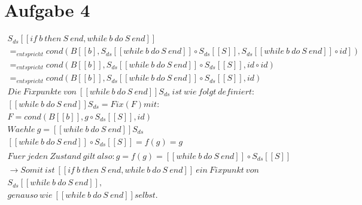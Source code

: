 \documentclass[]{article}
\begin{document}
\section{Aufgabe 4}
\begin{gather*}
S_{ds}  [[if \ b \ then \  S \  end, while \  b \  do \  S \  end ]] \\ 
=_{entspricht} cond(B [[b] , S_{ds} [[while \ b \  do \  S \ end]] \circ S_{ds}  [[S]], S_{ds} [[while \  b \  do \ S \  end ]] \circ id ])\\ 
=_{entspricht} cond(B [[b]], S_{ds} [[while \  b \  do \  S \ end]] \circ S_{ds}  [[S]],  id  \circ  id ) \\
=_{entspricht} cond(B [[b]], S_{ds} [[while \  b \  do \  S \ end]] \circ S_{ds}  [[S]],  id ) \\
Die \ Fixpunkte \ von \ [[while \ b \ do \ S \                                                                                                                                                                                                                                                                                                                                                       end ]] S_{ds} \ ist \ wie \ folgt \ definiert: \\ [[while \ b \ do \ S \ end]] S_{ds} = Fix(F) 
mit:\\  F = cond(B [[b]], g  \circ S_{ds}  [[S]],  id ) \\
Waehle \ g = [[while \ b \ do \ S \ end]] S_{ds}\\
[[while \  b \  do \  S \ end]]_{} \circ S_{ds}  [[S]] = f(g) = g \\
Fuer \ jeden \ Zustand  \  gilt \ also: g = f(g) = [[while \  b \  do \  S \ end]]_{} \circ S_{ds}  [[S]]  \\
\rightarrow Somit \ ist \ [[if \ b \ then \  S \  end, while \  b \  do \  S \  end ]] \ ein \ Fixpunkt \ von \\ S_{ds} [[while \ b \  do \  S \ end]] ,\\ genauso \ wie \  [[while \ b \  do \  S \ end]] selbst.
\end{gather*} 
\end{document}
